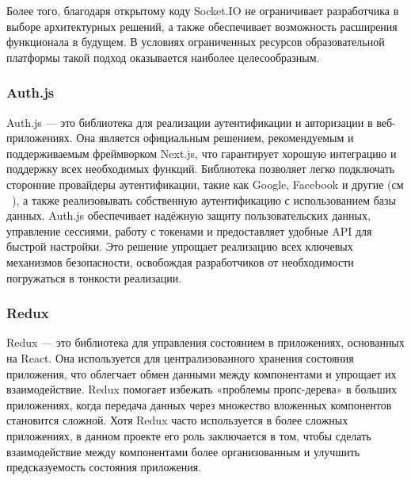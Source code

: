 Более того, благодаря открытому коду Socket.IO не ограничивает разработчика в выборе архитектурных решений, а также обеспечивает возможность расширения функционала в будущем. В условиях ограниченных ресурсов образовательной платформы такой подход оказывается наиболее целесообразным.

\subsubsection*{Auth.js}

Auth.js — это библиотека для реализации аутентификации и авторизации в веб-приложениях. Она является официальным решением, рекомендуемым и поддерживаемым фреймворком Next.js, что гарантирует хорошую интеграцию и поддержку всех необходимых функций. Библиотека позволяет легко подключать сторонние провайдеры аутентификации, такие как Google, Facebook и другие (см ~\cite{5}), а также реализовывать собственную аутентификацию с использованием базы данных. Auth.js обеспечивает надёжную защиту пользовательских данных, управление сессиями, работу с токенами и предоставляет удобные API для быстрой настройки. Это решение упрощает реализацию всех ключевых механизмов безопасности, освобождая разработчиков от необходимости погружаться в тонкости реализации.

\subsubsection*{Redux}

Redux — это библиотека для управления состоянием в приложениях, основанных на React. Она используется для централизованного хранения состояния приложения, что облегчает обмен данными между компонентами и упрощает их взаимодействие. Redux помогает избежать «проблемы пропс-дерева» в больших приложениях, когда передача данных через множество вложенных компонентов становится сложной. Хотя Redux часто используется в более сложных приложениях, в данном проекте его роль заключается в том, чтобы сделать взаимодействие между компонентами более организованным и улучшить предсказуемость состояния приложения.
